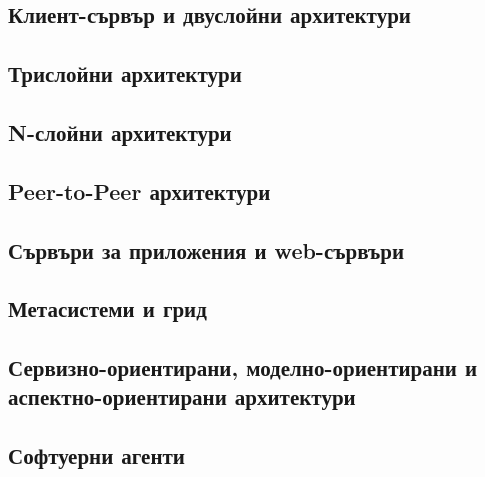 \documentclass[fleqn,12pt]{article}
\begin{document}
\subsection{Клиент-сървър и двуслойни архитектури}
\subsection{Трислойни архитектури}
\subsection{N-слойни архитектури}
\subsection{Peer-to-Peer архитектури}
\subsection{Сървъри за приложения и web-сървъри}
\subsection{Метасистеми и грид}
\subsection{Сервизно-ориентирани, моделно-ориентирани и аспектно-ориентирани архитектури}
\subsection{Софтуерни агенти}
\end{document}
